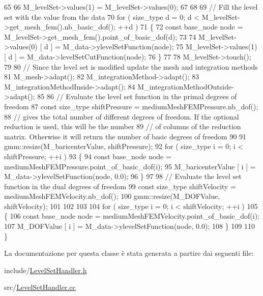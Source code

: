\begin{DoxyCode}
65 
66     M\_levelSet->values(1) = M\_levelSet->values(0);
67 
68 
69     \textcolor{comment}{// Fill the level set with the value from the data}
70     \textcolor{keywordflow}{for} ( size\_type d = 0; d < M\_levelSet->get\_mesh\_fem().nb\_basic\_dof(); ++d )
71     \{
72         \textcolor{keyword}{const} base\_node node = M\_levelSet->get\_mesh\_fem().point\_of\_basic\_dof(d);
73 
74         M\_levelSet->values(0) [ d ] = M\_data->ylevelSetFunction(node);
75         M\_levelSet->values(1) [ d ] = M\_data->levelSetCutFunction(node);
76     \}
77 
78     M\_levelSet->touch();
79 
80     \textcolor{comment}{// Since the level set is modified update the mesh and integration methods}
81     M\_mesh->adapt();
82     M\_integrationMethod->adapt();
83     M\_integrationMethodInside->adapt();
84     M\_integrationMethodOutside->adapt();
85 
86     \textcolor{comment}{// Evaluate the level set function in the primal degrees of freedom}
87     \textcolor{keyword}{const} size\_type shiftPressure = mediumMeshFEMPressure.nb\_dof();
88     \textcolor{comment}{// gives the total number of different degrees of freedom. If the optional reduction is used, this will
       be the number}
89     \textcolor{comment}{// of columns of the reduction matrix. Otherwise it will return the number of basic degrees of freedom}
90 
91     gmm::resize(M\_baricenterValue, shiftPressure);
92     \textcolor{keywordflow}{for} ( size\_type i = 0; i < shiftPressure; ++i )
93     \{
94         \textcolor{keyword}{const} base\_node node = mediumMeshFEMPressure.point\_of\_basic\_dof(i);
95         M\_baricenterValue [ i ] = M\_data->ylevelSetFunction(node, 0.0);
96     \}
97 
98     \textcolor{comment}{// Evaluate the level set function in the dual degrees of freedom}
99     \textcolor{keyword}{const} size\_type shiftVelocity = mediumMeshFEMVelocity.nb\_dof();
100     gmm::resize(M\_DOFValue, shiftVelocity);
101 
102 
103 
104     \textcolor{keywordflow}{for} ( size\_type i = 0; i < shiftVelocity; ++i )
105     \{
106     \textcolor{keyword}{const} base\_node node = mediumMeshFEMVelocity.point\_of\_basic\_dof(i);
107         M\_DOFValue [ i ] = M\_data->ylevelSetFunction(node, 0.0);
108     \}
109 
110 \}
\end{DoxyCode}


La documentazione per questa classe è stata generata a partire dai seguenti file\-:\begin{DoxyCompactItemize}
\item 
include/\hyperlink{LevelSetHandler_8h}{Level\-Set\-Handler.\-h}\item 
src/\hyperlink{LevelSetHandler_8cc}{Level\-Set\-Handler.\-cc}\end{DoxyCompactItemize}
